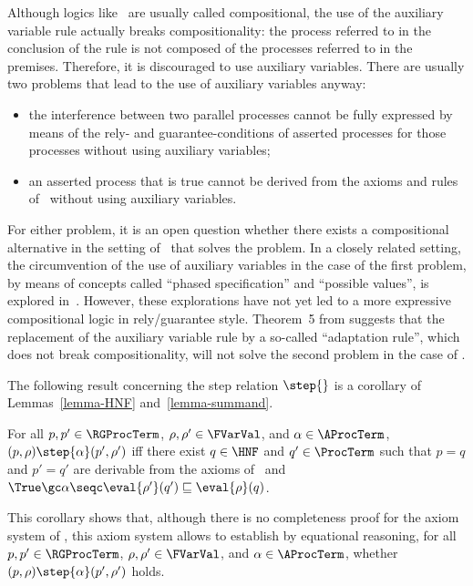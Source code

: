 \documentclass[runningheads]{llncs}
\begin{document}
Although logics like \RG\ are usually called compositional, the use of
the auxiliary variable rule actually breaks compositionality: the 
process referred to in the conclusion of the rule is not composed of the 
processes referred to in the premises.
Therefore, it is discouraged to use auxiliary variables.
There are usually two problems that lead to the use of auxiliary 
variables anyway:
\begin{itemize}
\item
the interference between two parallel processes cannot be fully 
expressed by means of the rely- and guarantee-conditions of asserted
processes for those processes without using auxiliary variables;
\item
an asserted process that is true cannot be derived from the axioms and 
rules of \RG\ without using auxiliary variables.
\end{itemize}
For either problem, it is an open question whether there exists a 
compositional alternative in the setting of \RG\ that solves the 
problem. 
In a closely related setting, the circumvention of the use of auxiliary 
variables in the case of the first problem, by means of concepts called 
``phased specification'' and ``possible values'', is explored 
in~\cite{JP11a,JY19a,Yat24a}.
However, these explorations have not yet led to a more expressive 
compositional logic in rely/guarantee style.
Theorem~5 from \cite{GR16a} suggests that the replacement of the 
auxiliary variable rule by a so-called ``adaptation rule'', which does 
not break compositionality, will not solve the second problem in the 
case of \RG.

The  following result concerning the step relation $\step{}$ is a 
corollary of Lemmas~\ref{lemma-HNF} and~\ref{lemma-summand}.
%
\begin{corollary}
\label{corollary-step-rel}
For all $p,p' \in \RGProcTerm$, $\rho,\rho' \in \FVarVal$, and 
$\alpha \in \AProcTerm$,
$(p,\rho) \step{\alpha} (p',\rho')$ iff 
there exist $q \in \HNF$ and $q' \in \ProcTerm$ such that 
$p = q$ and $p' = q'$ are derivable from the axioms of \deACPei\ and
$\True \gc \alpha \seqc \eval{\rho'}(q') \sqsubseteq \eval{\rho}(q)$.
\end{corollary}
%
This corollary shows that, although there is no completeness proof for
the axiom system of \deACPei, this axiom system allows to establish by 
equational reasoning, for all $p,p' \in \RGProcTerm$, 
$\rho,\rho' \in \FVarVal$, and $\alpha \in \AProcTerm$, whether 
$(p,\rho) \step{\alpha} (p',\rho')$ holds.
\end{document}
